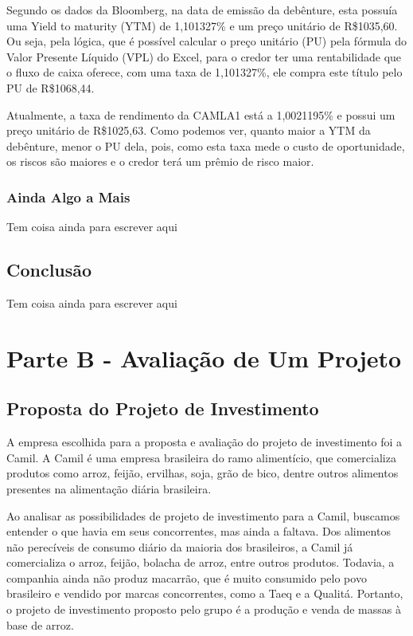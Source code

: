 \documentclass[a4paper,12pt]{article}[abntex2]
\newcommand{\real}[1]{R\$#1}
\begin{document}
Segundo os dados da Bloomberg, na data de emissão da debênture, esta possuía uma Yield to maturity (YTM) de 1,101327\% e um preço unitário de \real{1035,60}. Ou seja, pela lógica, que é possível calcular o preço unitário (PU) pela fórmula do Valor Presente Líquido (VPL) do Excel, para o credor ter uma rentabilidade que o fluxo de caixa oferece, com uma taxa de 1,101327\%, ele compra este título pelo PU de \real{1068,44}. 

Atualmente, a taxa de rendimento da CAMLA1 está a 1,0021195\% e possui um preço unitário de \real{1025,63}. Como podemos ver, quanto maior a YTM da debênture, menor o PU dela, pois, como esta taxa mede o custo de oportunidade, os riscos são maiores e o credor terá um prêmio de risco maior.


\subsubsection{\textbf{Ainda Algo a Mais}}
Tem coisa ainda para escrever aqui
\subsection{\textbf{Conclusão}}
Tem coisa ainda para escrever aqui
\newpage

\section{\textbf{Parte B - Avaliação de Um Projeto}}
\subsection{\textbf{Proposta do Projeto de Investimento}}
A empresa escolhida para a proposta e avaliação do projeto de investimento foi a Camil. A Camil é uma empresa brasileira do ramo alimentício, que comercializa produtos como arroz, feijão, ervilhas, soja, grão de bico, dentre outros alimentos presentes na alimentação diária brasileira.

Ao analisar as possibilidades de projeto de investimento para a Camil, buscamos entender o que havia em seus concorrentes, mas ainda a faltava. Dos alimentos não perecíveis de consumo diário da maioria dos brasileiros, a Camil já comercializa o arroz, feijão, bolacha de arroz, entre outros produtos. Todavia, a companhia ainda não produz macarrão, que é muito consumido pelo povo brasileiro e vendido por marcas concorrentes, como a Taeq e a Qualitá. Portanto, o projeto de investimento proposto pelo grupo é a produção e venda de massas à base de arroz.
\end{document}
